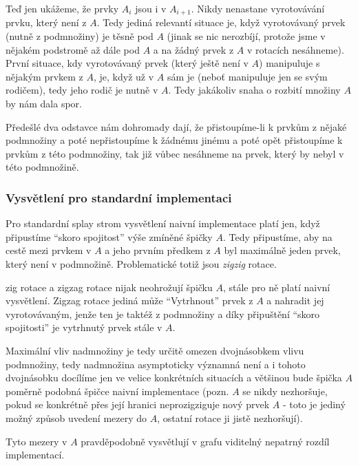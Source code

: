 \documentclass[a4paper,12pt]{article} %
\begin{document}
Teď jen ukážeme, že prvky $A_i$ jsou i v $A_{i+1}$. Nikdy nenastane vyrotovávání prvku, který není z $A$. Tedy jediná relevantí situace je, když vyrotovávaný prvek (nutně z podmnožiny) je těsně pod $A$ (jinak se nic nerozbíjí, protože jsme v nějakém podstromě až dále pod $A$ a na žádný prvek z $A$ v rotacích nesáhneme). První situace, kdy vyrotovávaný prvek (který ještě není v $A$) manipuluje s nějakým prvkem z $A$, je, když už v $A$ sám je (neboť manipuluje jen se svým rodičem), tedy jeho rodič je nutně v $A$. Tedy jakákoliv snaha o rozbití množiny $A$ by nám dala spor.

Předešlé dva odstavce nám dohromady dají, že přistoupíme-li k prvkům z nějaké podmnožiny a poté nepřistoupíme k žádnému jinému a poté opět přistoupíme k prvkům z této podmnožiny, tak již vůbec nesáhneme na prvek, který by nebyl v této podmnožině.

\subsubsection*{Vysvětlení pro standardní implementaci}

Pro standardní splay strom vysvětlení naivní implementace platí jen, když připustíme ``skoro spojitost'' výše zmíněné špičky $A$. Tedy připustíme, aby na cestě mezi prvkem v $A$ a jeho prvním předkem z $A$ byl maximálně jeden prvek, který není v podmnožině. Problematické totiž jsou \textit{zigzig} rotace.

zig rotace a zigzag rotace nijak neohrožují špičku $A$, stále pro ně platí naivní vysvětlení. Zigzag rotace jediná může ``Vytrhnout'' prvek z $A$ a nahradit jej vyrotovávaným, jenže ten je taktéž z podmnožiny a díky připuštění ``skoro spojitosti'' je vytrhnutý prvek stále v $A$.

Maximální vliv nadmnožiny je tedy určitě omezen dvojnásobkem vlivu podmnožiny, tedy nadmnožina asymptoticky významná není a i tohoto dvojnásobku docílíme jen ve velice konkrétních situacích a většinou bude špička $A$ poměrně podobná špičce naivní implementace (pozn. $A$ se nikdy nezhoršuje, pokud se konkrétně přes její hranici neprozigziguje nový prvek $A$ - toto je jediný možný způsob uvedení mezery do $A$, ostatní rotace ji jistě nezhoršují).

Tyto mezery v $A$ pravděpodobně vysvětlují v grafu viditelný nepatrný rozdíl implementací.
\end{document}
